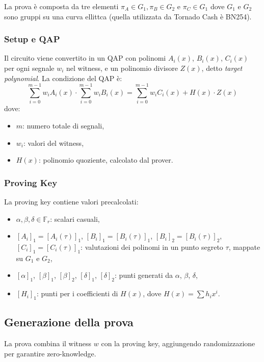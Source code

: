 La prova è composta da tre elementi $\pi_A\in G_1,\pi_B\in G_2$ e $\pi_C\in G_1$ dove $G_1$ e $G_2$ sono gruppi su una curva ellittca (quella utilizzata da Tornado Cash è BN254).

\subsubsection{Setup e QAP}

Il circuito viene convertito in un QAP con polinomi \(A_i(x)\), \(B_i(x)\), \(C_i(x)\) per ogni segnale \(w_i\) nel witness, e un polinomio divisore \(Z(x)\), detto \emph{target polynomial}. La condizione del QAP è:
\begin{equation}
    \sum_{i=0}^{m-1} w_i A_i(x) \cdot \sum_{i=0}^{m-1} w_i B_i(x) = \sum_{i=0}^{m-1} w_i C_i(x) + H(x) \cdot Z(x)
\end{equation}
dove:
\begin{itemize}
    \item \(m\): numero totale di segnali,
    \item \(w_i\): valori del witness,
    \item \(H(x)\): polinomio quoziente, calcolato dal prover.
\end{itemize}

\subsubsection{Proving Key}
La proving key contiene valori precalcolati:
\begin{itemize}
    \item \(\alpha, \beta, \delta \in \mathbb{F}_r\): scalari casuali,
    \item \([A_i]_1 = [A_i(\tau)]_1\), \([B_i]_1 = [B_i(\tau)]_1\), \([B_i]_2 = [B_i(\tau)]_2\), \([C_i]_1 = [C_i(\tau)]_1\): valutazioni dei polinomi in un punto segreto \(\tau\), mappate su \(G_1\) e \(G_2\),
    \item \([\alpha]_1\), \([\beta]_1\), \([\beta]_2\), \([\delta]_1\), \([\delta]_2\): punti generati da \(\alpha\), \(\beta\), \(\delta\),
    \item \([H_i]_1\): punti per i coefficienti di \(H(x)\), dove \(H(x) = \sum h_i x^i\).
\end{itemize}

\subsection{Generazione della prova}
La prova combina il witness \(w\) con la proving key, aggiungendo randomizzazione per garantire zero-knowledge.

